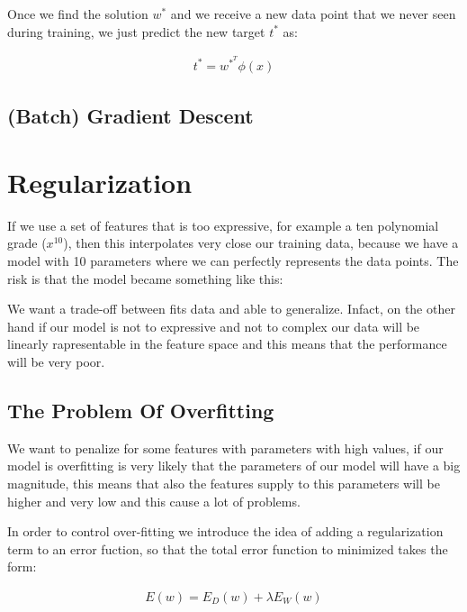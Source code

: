 \noindent Once we find the solution $w^*$ and we receive a new data point that we never seen during training, we just predict the new target $t^*$ as:

\begin{Equation}[H]
	\centering
	\begin{equation}
	\begin{aligned}
	t^* = w^{*^T} \phi(x)
	\end{aligned}
	\end{equation}
	\label{eq:mathmodelaada}
\end{Equation}


\subsection{(Batch) Gradient Descent}
\label{subsec:batchgradientdescen}


\section{Regularization}
\label{subsec:poverfitting}
If we use a set of features that is too expressive, for example a ten polynomial grade ($x^{10}$), then this interpolates very close our training data, because we have a model with 10 parameters where we can perfectly represents the data points. The risk is that the model became something like this:

\noindent[picture]

\noindent We want a trade-off between fits data and able to generalize. Infact, on the other hand if our model is not to expressive and not to complex our data will be linearly rapresentable in the feature space and this means that the performance will be very poor. 

\subsection{The Problem Of Overfitting}
We want to penalize for some features with parameters with high values, if our model is overfitting is very likely that the parameters of our model will have a big magnitude, this means that also the features supply to this parameters will be higher and very low and this cause a lot of problems.

\noindent In order to control over-fitting we introduce the idea of adding a regularization term to an error fuction, so that the total error function to minimized takes the form:

\begin{Equation}[H]
	\centering
		\begin{equation}
			\begin{aligned}
				E(w) = E_D(w) + \lambda E_W(w)
			\end{aligned}
		\end{equation}
	\label{eq:mathmodelaada}
\end{Equation}

